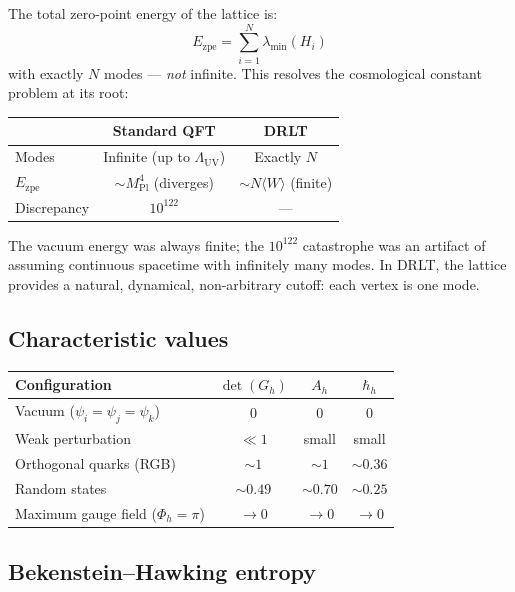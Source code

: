 The total zero-point energy of the lattice is:
\begin{equation}
E_\text{zpe} = \sum_{i=1}^{N} \lambda_{\min}(H_i)
\end{equation}
with exactly $N$ modes --- \emph{not} infinite. This resolves the cosmological constant problem at its root:

\begin{center}
\begin{tabular}{lcc}
\hline
& Standard QFT & DRLT \\
\hline
Modes & Infinite (up to $\Lambda_\text{UV}$) & Exactly $N$ \\
$E_\text{zpe}$ & $\sim M_\text{Pl}^4$ (diverges) & $\sim N\langle W\rangle$ (finite) \\
Discrepancy & $10^{122}$ & --- \\
\hline
\end{tabular}
\end{center}

The vacuum energy was always finite; the $10^{122}$ catastrophe was an artifact of assuming continuous spacetime with infinitely many modes. In DRLT, the lattice provides a natural, dynamical, non-arbitrary cutoff: each vertex is one mode.

\subsection{Characteristic values}

\begin{center}
\begin{tabular}{lccc}
\hline
Configuration & $\det(G_h)$ & $A_h$ & $\hbar_h$ \\
\hline
Vacuum ($\psi_i = \psi_j = \psi_k$) & 0 & 0 & 0 \\
Weak perturbation & $\ll 1$ & small & small \\
Orthogonal quarks (RGB) & $\sim 1$ & $\sim 1$ & $\sim 0.36$ \\
Random states & $\sim 0.49$ & $\sim 0.70$ & $\sim 0.25$ \\
Maximum gauge field ($\Phi_h = \pi$) & $\to 0$ & $\to 0$ & $\to 0$ \\
\hline
\end{tabular}
\end{center}

\subsection{Bekenstein--Hawking entropy}


